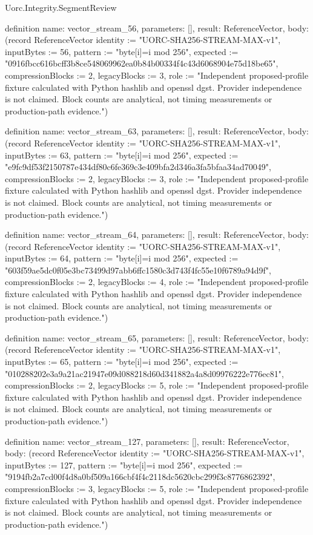 \begin{lexlean}{Uorc.Integrity.SegmentReview}
\begin{semanticmodule}
definition{
  name: vector_stream_56,
  parameters: [],
  result: ReferenceVector,
  body: (record ReferenceVector {identity := "UORC-SHA256-STREAM-MAX-v1", inputBytes := 56, pattern := "byte[i]=i mod 256", expected := "0916fbcc616bcff3b8ce548069962ea0b84b00334f4c43d6068904e75d18be65", compressionBlocks := 2, legacyBlocks := 3, role := "Independent proposed-profile fixture calculated with Python hashlib and openssl dgst. Provider independence is not claimed. Block counts are analytical, not timing measurements or production-path evidence."})
}

definition{
  name: vector_stream_63,
  parameters: [],
  result: ReferenceVector,
  body: (record ReferenceVector {identity := "UORC-SHA256-STREAM-MAX-v1", inputBytes := 63, pattern := "byte[i]=i mod 256", expected := "e9fc9df53f2150787e434df80c6fe369c3e409bfa2d346a3fa5bfaa34ad70049", compressionBlocks := 2, legacyBlocks := 3, role := "Independent proposed-profile fixture calculated with Python hashlib and openssl dgst. Provider independence is not claimed. Block counts are analytical, not timing measurements or production-path evidence."})
}

definition{
  name: vector_stream_64,
  parameters: [],
  result: ReferenceVector,
  body: (record ReferenceVector {identity := "UORC-SHA256-STREAM-MAX-v1", inputBytes := 64, pattern := "byte[i]=i mod 256", expected := "603f59ae5dc0f05e3bc73499d97abb6ffc1580c3d743f4fc55e10f6789a94d9f", compressionBlocks := 2, legacyBlocks := 4, role := "Independent proposed-profile fixture calculated with Python hashlib and openssl dgst. Provider independence is not claimed. Block counts are analytical, not timing measurements or production-path evidence."})
}

definition{
  name: vector_stream_65,
  parameters: [],
  result: ReferenceVector,
  body: (record ReferenceVector {identity := "UORC-SHA256-STREAM-MAX-v1", inputBytes := 65, pattern := "byte[i]=i mod 256", expected := "010288202e3a9a21ac21947e09d088218d60d341882a4a8d09976222e776ec81", compressionBlocks := 2, legacyBlocks := 5, role := "Independent proposed-profile fixture calculated with Python hashlib and openssl dgst. Provider independence is not claimed. Block counts are analytical, not timing measurements or production-path evidence."})
}

definition{
  name: vector_stream_127,
  parameters: [],
  result: ReferenceVector,
  body: (record ReferenceVector {identity := "UORC-SHA256-STREAM-MAX-v1", inputBytes := 127, pattern := "byte[i]=i mod 256", expected := "9194fb2a7cd00f4d8a0bf509a166cbf4f4c2118dc5620cbc299f3c8776862392", compressionBlocks := 3, legacyBlocks := 5, role := "Independent proposed-profile fixture calculated with Python hashlib and openssl dgst. Provider independence is not claimed. Block counts are analytical, not timing measurements or production-path evidence."})
}


\end{semanticmodule}
\end{lexlean}
